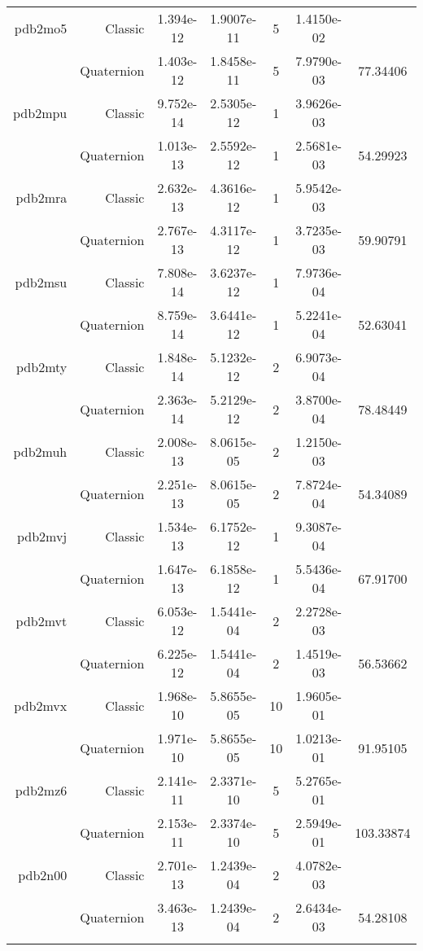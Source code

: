 \begin{xltabular}{\textwidth}{r|rS[table-format=1.3e+2]S[table-format=1.4e+2]cS[table-format=1.4e+2]S[table-format=-1.5]}
pdb2mo5 & Classic & 1.394e-12 & 1.9007e-11 & 5 & 1.4150e-02 & \\
& Quaternion & 1.403e-12 & 1.8458e-11 & 5 & 7.9790e-03 & 77.34406\\  \addlinespace
pdb2mpu & Classic & 9.752e-14 & 2.5305e-12 & 1 & 3.9626e-03 & \\
& Quaternion & 1.013e-13 & 2.5592e-12 & 1 & 2.5681e-03 & 54.29923\\  \addlinespace
pdb2mra & Classic & 2.632e-13 & 4.3616e-12 & 1 & 5.9542e-03 & \\
& Quaternion & 2.767e-13 & 4.3117e-12 & 1 & 3.7235e-03 & 59.90791\\  \addlinespace
pdb2msu & Classic & 7.808e-14 & 3.6237e-12 & 1 & 7.9736e-04 & \\
& Quaternion & 8.759e-14 & 3.6441e-12 & 1 & 5.2241e-04 & 52.63041\\  \addlinespace
pdb2mty & Classic & 1.848e-14 & 5.1232e-12 & 2 & 6.9073e-04 & \\
& Quaternion & 2.363e-14 & 5.2129e-12 & 2 & 3.8700e-04 & 78.48449\\  \addlinespace
pdb2muh & Classic & 2.008e-13 & 8.0615e-05 & 2 & 1.2150e-03 & \\
& Quaternion & 2.251e-13 & 8.0615e-05 & 2 & 7.8724e-04 & 54.34089\\  \addlinespace
pdb2mvj & Classic & 1.534e-13 & 6.1752e-12 & 1 & 9.3087e-04 & \\
& Quaternion & 1.647e-13 & 6.1858e-12 & 1 & 5.5436e-04 & 67.91700\\  \addlinespace
pdb2mvt & Classic & 6.053e-12 & 1.5441e-04 & 2 & 2.2728e-03 & \\
& Quaternion & 6.225e-12 & 1.5441e-04 & 2 & 1.4519e-03 & 56.53662\\  \addlinespace
pdb2mvx & Classic & 1.968e-10 & 5.8655e-05 & 10 & 1.9605e-01 & \\
& Quaternion & 1.971e-10 & 5.8655e-05 & 10 & 1.0213e-01 & 91.95105\\  \addlinespace
pdb2mz6 & Classic & 2.141e-11 & 2.3371e-10 & 5 & 5.2765e-01 & \\
& Quaternion & 2.153e-11 & 2.3374e-10 & 5 & 2.5949e-01 & 103.33874\\  \addlinespace
pdb2n00 & Classic & 2.701e-13 & 1.2439e-04 & 2 & 4.0782e-03 & \\
& Quaternion & 3.463e-13 & 1.2439e-04 & 2 & 2.6434e-03 & 54.28108\\  \addlinespace

\end{xltabular}
